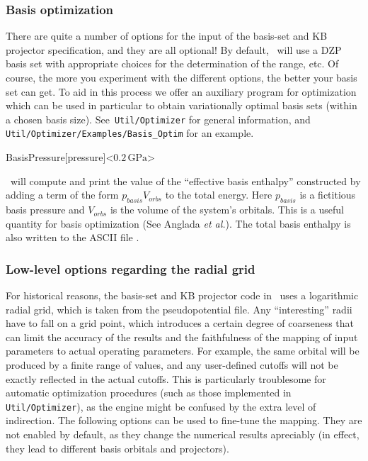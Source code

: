 \subsubsection{Basis optimization}

There are quite a number of options for the input of the basis-set and
KB projector specification, and they are all optional! By default,
\siesta\ will use a DZP basis set with appropriate choices for the
determination of the range, etc. Of course, the more you experiment
with the different options, the better your basis set can get. To aid
in this process we offer an auxiliary program for optimization which
can be used in particular to obtain variationally optimal basis sets
(within a chosen basis size). See \texttt{Util/Optimizer}
for general information, and \texttt{Util/Optimizer/Examples/Basis\_Optim}
for an example.

\begin{fdfentry}{BasisPressure}[pressure]<$0.2\,\mathrm{GPa}$>

  \siesta\ will compute and print the value of the ``effective basis
  enthalpy'' constructed by adding a term of the form
  $p_{basis}V_{orbs}$ to the total energy. Here $p_{basis}$ is a
  fictitious basis pressure and $V_{orbs}$ is the volume of the
  system's orbitals. This is a useful quantity for basis optimization
  (See Anglada \emph{et al.\/}). The total basis enthalpy is also
  written to the ASCII file .
  
\end{fdfentry}



\subsubsection{Low-level options regarding the radial grid}

For historical reasons, the basis-set and KB projector code in
\siesta\ uses a logarithmic radial grid, which is taken from the
pseudopotential file. Any ``interesting'' radii have to fall on a grid
point, which introduces a certain degree of coarseness that can limit
the accuracy of the results and the faithfulness of the mapping of
input parameters to actual operating parameters. For example, the same
orbital will be produced by a finite range of 
values, and any user-defined cutoffs will not be exactly reflected in
the actual cutoffs. This is particularly troublesome for automatic
optimization procedures (such as those implemented in
\texttt{Util/Optimizer}), as the engine might be confused by the extra
level of indirection. The following options can be used to fine-tune
the mapping.  They are not enabled by default, as they change the
numerical results apreciably (in effect, they lead to different basis
orbitals and projectors).


